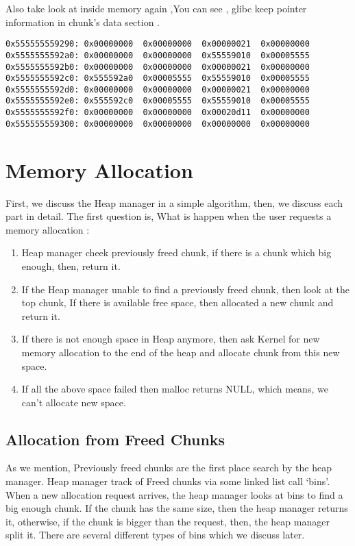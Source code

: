 \documentclass{masterthesis}
\newcommand*\libc{glibc}
\begin{document}
Also take look at inside memory again ,You can see , \libc{} keep pointer information in chunk's data section .
\begin{lstlisting}[frame=tlrb]
0x555555559290:	0x00000000	0x00000000	0x00000021	0x00000000
0x5555555592a0:	0x00000000	0x00000000	0x55559010	0x00005555
0x5555555592b0:	0x00000000	0x00000000	0x00000021	0x00000000
0x5555555592c0:	0x555592a0	0x00005555	0x55559010	0x00005555
0x5555555592d0:	0x00000000	0x00000000	0x00000021	0x00000000
0x5555555592e0:	0x555592c0	0x00005555	0x55559010	0x00005555
0x5555555592f0:	0x00000000	0x00000000	0x00020d11	0x00000000
0x555555559300:	0x00000000	0x00000000	0x00000000	0x00000000
\end{lstlisting}
 
\section{Memory Allocation}
 First, we discuss the Heap manager in a simple algorithm, then, we discuss each part in detail. The first question is, What is happen when the user requests a memory allocation : 
\begin{enumerate}
	\item Heap manager cheek previously freed chunk, if there is a chunk which big enough, then, return it.
	\item If the Heap manager unable to find a previously freed chunk, then look at the top chunk, If there is available free space, then allocated a new chunk and return it.
	\item If there is not enough space in Heap anymore, then ask Kernel for new memory allocation to the end of the heap and allocate chunk from this new space.
	\item If all the above space failed then malloc returns NULL, which means, we can’t allocate new space.
\end{enumerate}

\subsection{Allocation from Freed Chunks}
As we mention, Previously freed chunks are the first place search by the heap manager. Heap manager track of Freed chunks via some linked list call ‘bins’. When a new allocation request arrives, the heap manager looks at bins to find a big enough chunk. If the chunk has the same size, then the heap manager returns it, otherwise, if the chunk is bigger than the request, then, the heap manager split it. There are several different types of bins which we discuss later.
\end{document}
